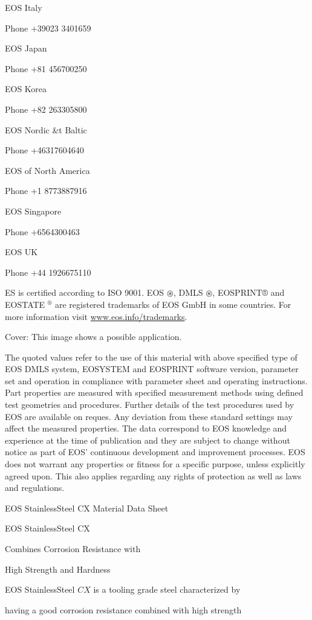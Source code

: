 \documentclass[10pt]{article}
\begin{document}
EOS Italy

Phone +39023 3401659

EOS Japan

Phone +81 456700250

EOS Korea

Phone +82 263305800

EOS Nordic \&t Baltic

Phone +46317604640

EOS of North America

Phone +1 8773887916

EOS Singapore

Phone +6564300463

EOS UK

Phone +44 1926675110

ES is certified according to ISO 9001. EOS $\circledast$, DMLS $\circledast$, EOSPRINT® and EOSTATE ${ }^{\circledR}$ are registered trademarks of EOS GmbH in some countries. For more information visit \href{http://www.eos.info/trademarks}{www.eos.info/trademarks}.

Cover: This image shows a possible application.

The quoted values refer to the use of this material with above specified type of EOS DMLS system, EOSYSTEM and EOSPRINT software version, parameter set and operation in compliance with parameter sheet and operating instructions. Part properties are measured with specified measurement methods using defined test geometries and procedures. Further details of the test procedures used by EOS are available on reques. Any deviation from these standard settings may affect the measured properties. The data correspond to EOS knowledge and experience at the time of publication and they are subject to change without notice as part of EOS' continuous development and improvement processes. EOS does not warrant any properties or fitness for a specific purpose, unless explicitly agreed upon. This also applies regarding any rights of protection as well as laws and regulations.

EOS StainlessSteel CX Material Data Sheet

EOS StainlessSteel CX

Combines Corrosion Resistance with

High Strength and Hardness

EOS StainlessSteel $C X$ is a tooling grade steel characterized by

having a good corrosion resistance combined with high strength
\end{document}
